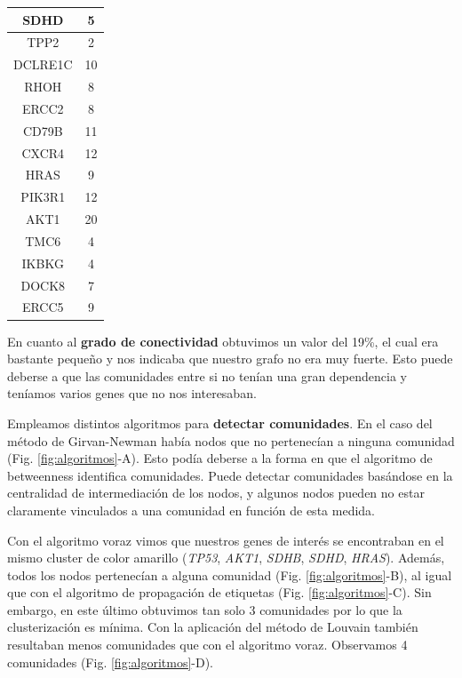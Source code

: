 \begin{table}[h]
\begin{minipage}{0.5\textwidth}
\begin{tabular}{|c|c|}
				\hline
				SDHD & 5 \\
				\hline
				TPP2 & 2 \\
				\hline
				DCLRE1C & 10 \\
				\hline
				RHOH & 8 \\
				\hline
				ERCC2 & 8 \\
				\hline
				CD79B & 11 \\
				\hline
				CXCR4 & 12 \\
				\hline
				HRAS & 9 \\
				\hline
				PIK3R1 & 12 \\
				\hline
				AKT1 & 20 \\
				\hline
				TMC6 & 4 \\
				\hline
				IKBKG & 4 \\
				\hline
				DOCK8 & 7 \\
				\hline
				ERCC5 & 9 \\
				\hline
			\end{tabular}
			
			
		\end{minipage}
	\end{table}
	



\vspace{3pt}

En cuanto al \textbf{grado de conectividad} obtuvimos un valor del 19\%, el cual era bastante pequeño y nos indicaba que nuestro grafo no era muy fuerte. Esto puede deberse a que las comunidades entre si no tenían una gran dependencia y teníamos varios genes que no nos interesaban. 

\vspace{3pt}

Empleamos distintos algoritmos para \textbf{detectar comunidades}. En el caso del método de Girvan-Newman había nodos que no pertenecían a ninguna comunidad (Fig. \ref{fig:algoritmos}-A). Esto podía deberse a la forma en que el algoritmo de betweenness identifica comunidades. Puede detectar comunidades basándose en la centralidad de intermediación de los nodos, y algunos nodos pueden no estar claramente vinculados a una comunidad en función de esta medida.

\vspace{3pt}

Con el algoritmo voraz vimos que nuestros genes de interés se encontraban en el mismo cluster de color amarillo (\textit{TP53}, \textit{AKT1}, \textit{SDHB}, \textit{SDHD}, \textit{HRAS}). Además, todos los nodos pertenecían a alguna comunidad (Fig. \ref{fig:algoritmos}-B), al igual que con el algoritmo de propagación de etiquetas (Fig. \ref{fig:algoritmos}-C). Sin embargo, en este último obtuvimos tan solo 3 comunidades por lo que la clusterización es mínima.  Con la aplicación del método de Louvain también resultaban menos comunidades que con el algoritmo voraz. Observamos 4 comunidades (Fig. \ref{fig:algoritmos}-D). 

